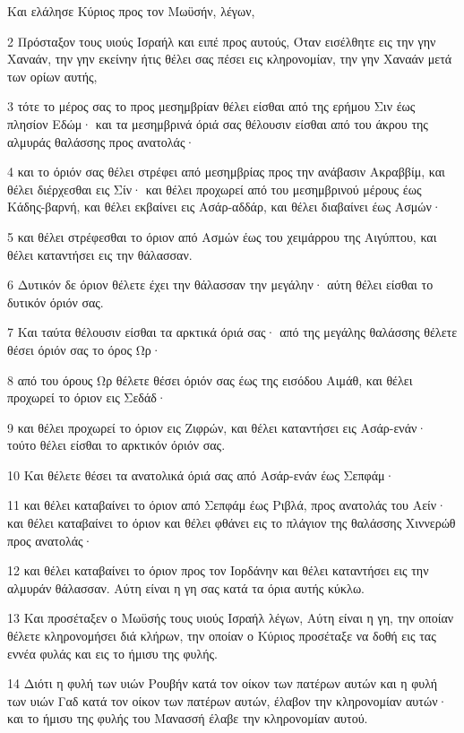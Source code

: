 \par Και ελάλησε Κύριος προς τον Μωϋσήν, λέγων,
\par 2 Πρόσταξον τους υιούς Ισραήλ και ειπέ προς αυτούς, Όταν εισέλθητε εις την γην Χαναάν, την γην εκείνην ήτις θέλει σας πέσει εις κληρονομίαν, την γην Χαναάν μετά των ορίων αυτής,
\par 3 τότε το μέρος σας το προς μεσημβρίαν θέλει είσθαι από της ερήμου Σιν έως πλησίον Εδώμ· και τα μεσημβρινά όριά σας θέλουσιν είσθαι από του άκρου της αλμυράς θαλάσσης προς ανατολάς·
\par 4 και το όριόν σας θέλει στρέφει από μεσημβρίας προς την ανάβασιν Ακραββίμ, και θέλει διέρχεσθαι εις Σίν· και θέλει προχωρεί από του μεσημβρινού μέρους έως Κάδης-βαρνή, και θέλει εκβαίνει εις Ασάρ-αδδάρ, και θέλει διαβαίνει έως Ασμών·
\par 5 και θέλει στρέφεσθαι το όριον από Ασμών έως του χειμάρρου της Αιγύπτου, και θέλει καταντήσει εις την θάλασσαν.
\par 6 Δυτικόν δε όριον θέλετε έχει την θάλασσαν την μεγάλην· αύτη θέλει είσθαι το δυτικόν όριόν σας.
\par 7 Και ταύτα θέλουσιν είσθαι τα αρκτικά όριά σας· από της μεγάλης θαλάσσης θέλετε θέσει όριόν σας το όρος Ωρ·
\par 8 από του όρους Ωρ θέλετε θέσει όριόν σας έως της εισόδου Αιμάθ, και θέλει προχωρεί το όριον εις Σεδάδ·
\par 9 και θέλει προχωρεί το όριον εις Ζιφρών, και θέλει καταντήσει εις Ασάρ-ενάν· τούτο θέλει είσθαι το αρκτικόν όριόν σας.
\par 10 Και θέλετε θέσει τα ανατολικά όριά σας από Ασάρ-ενάν έως Σεπφάμ·
\par 11 και θέλει καταβαίνει το όριον από Σεπφάμ έως Ριβλά, προς ανατολάς του Αείν· και θέλει καταβαίνει το όριον και θέλει φθάνει εις το πλάγιον της θαλάσσης Χιννερώθ προς ανατολάς·
\par 12 και θέλει καταβαίνει το όριον προς τον Ιορδάνην και θέλει καταντήσει εις την αλμυράν θάλασσαν. Αύτη είναι η γη σας κατά τα όρια αυτής κύκλω.
\par 13 Και προσέταξεν ο Μωϋσής τους υιούς Ισραήλ λέγων, Αύτη είναι η γη, την οποίαν θέλετε κληρονομήσει διά κλήρων, την οποίαν ο Κύριος προσέταξε να δοθή εις τας εννέα φυλάς και εις το ήμισυ της φυλής.
\par 14 Διότι η φυλή των υιών Ρουβήν κατά τον οίκον των πατέρων αυτών και η φυλή των υιών Γαδ κατά τον οίκον των πατέρων αυτών, έλαβον την κληρονομίαν αυτών· και το ήμισυ της φυλής του Μανασσή έλαβε την κληρονομίαν αυτού.
